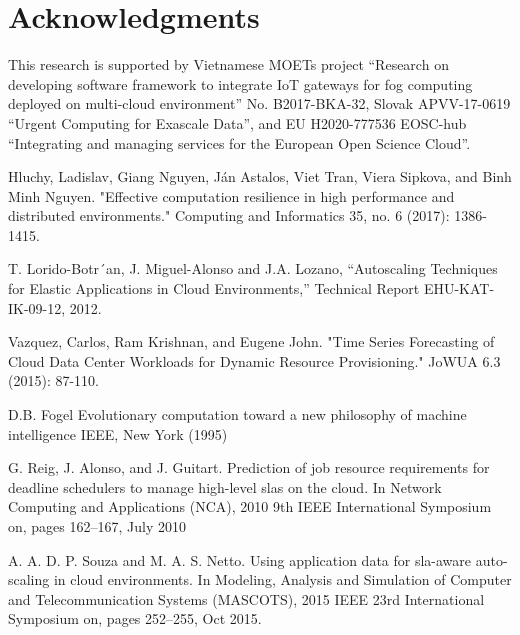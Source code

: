 \documentclass[runningheads]{llncs}
\begin{document}
%
%
%
% 
% 
%
\section*{Acknowledgments} This research is supported by Vietnamese MOETs project ``Research on developing software framework to integrate IoT gateways for fog computing deployed on multi-cloud environment'' No. B2017-BKA-32,
Slovak APVV-17-0619 ``Urgent Computing for Exascale Data'', and
EU H2020-777536 EOSC-hub ``Integrating and managing services for the European Open Science Cloud''.

\begin{thebibliography}{8}

Hluchy, Ladislav, Giang Nguyen, Ján Astalos, Viet Tran, Viera Sipkova, and Binh Minh Nguyen. "Effective computation resilience in high performance and distributed environments." Computing and Informatics 35, no. 6 (2017): 1386-1415.

T. Lorido-Botr´an, J. Miguel-Alonso and J.A. Lozano, “Autoscaling
Techniques for Elastic Applications in Cloud Environments,”
Technical Report EHU-KAT-IK-09-12, 2012.


Vazquez, Carlos, Ram Krishnan, and Eugene John. "Time Series Forecasting of Cloud Data Center Workloads for Dynamic Resource Provisioning." JoWUA 6.3 (2015): 87-110.

D.B. Fogel Evolutionary computation toward a new philosophy of machine intelligence IEEE, New York (1995)

G. Reig, J. Alonso, and J. Guitart. Prediction of job resource requirements for deadline schedulers
to manage high-level slas on the cloud. In Network Computing and Applications (NCA), 2010 9th
IEEE International Symposium on, pages 162–167, July 2010

A. A. D. P. Souza and M. A. S. Netto. Using application data for sla-aware auto-scaling in cloud
environments. In Modeling, Analysis and Simulation of Computer and Telecommunication Systems
(MASCOTS), 2015 IEEE 23rd International Symposium on, pages 252–255, Oct 2015.\


\end{thebibliography}
\end{document}
